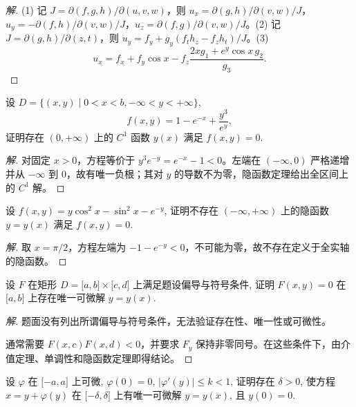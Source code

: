 \documentclass[../../数学分析培优讲义(答案版).tex]{subfiles}
\begin{document}
\begin{proof}[解]
(1) 记 $J=\partial(f,g,h)/\partial(u,v,w)$，则
$u_x=\partial(g,h)/\partial(v,w)/J$，$u_y=-\partial(f,h)/\partial(v,w)/J$，$u_z=\partial(f,g)/\partial(v,w)/J$。(2) 记 $J=\partial(g,h)/\partial(z,t)$，则
$u_y=f_y+g_y(f_th_z-f_zh_t)/J$。(3)
\[
u_x=f_x+f_y\cos x-f_z\dfrac{2xg_1+e^y\cos x\,g_2}{g_3}.
\]
\end{proof}


\begin{example}
设 $D=\{(x,y)\mid0<x<b,-\infty<y<+\infty\}$,
\[
    f(x,y)=1-e^{-x}+\dfrac{y^3}{e^y},
\]
证明存在 $(0,+\infty)$ 上的 $C^1$ 函数 $y(x)$ 满足 $f(x,y)=0$.
\end{example}

\begin{proof}[解]
对固定 $x>0$，方程等价于 $y^3e^{-y}=e^{-x}-1<0$。左端在 $(-\infty,0)$ 严格递增并从 $-\infty$ 到 $0$，故有唯一负根；其对 $y$ 的导数不为零，隐函数定理给出全区间上的 $C^1$ 解。
\end{proof}

\begin{example}
设 $f(x,y)=y\cos^2x-\sin^2x-e^{-y}$, 证明不存在 $(-\infty,+\infty)$ 上的隐函数 $y=y(x)$ 满足 $f(x,y)=0$.
\end{example}

\begin{proof}[解]
取 $x=\pi/2$，方程左端为 $-1-e^{-y}<0$，不可能为零，故不存在定义于全实轴的隐函数。
\end{proof}

\begin{example}
设 $F$ 在矩形 $D=\lbrack a,b\rbrack\times\lbrack c,d\rbrack$ 上满足题设偏导与符号条件, 证明 $F(x,y)=0$ 在 $\lbrack a,b\rbrack$ 上存在唯一可微解 $y=y(x)$.
\end{example}

\begin{proof}[解]
题面没有列出所谓偏导与符号条件，无法验证存在性、唯一性或可微性。

通常需要 $F(x,c)F(x,d)<0$，并要求 $F_y$ 保持非零同号。在这些条件下，由介值定理、单调性和隐函数定理即得结论。
\end{proof}

\begin{example}
设 $\varphi$ 在 $\lbrack-a,a\rbrack$ 上可微, $\varphi(0)=0$, $|\varphi'(y)|\leq k<1$, 证明存在 $\delta>0$, 使方程 $x=y+\varphi(y)$ 在 $\lbrack-\delta,\delta\rbrack$ 上有唯一可微解 $y=y(x)$, 且 $y(0)=0$.
\end{example}
\end{document}
